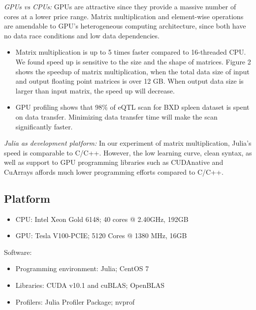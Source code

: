 \documentclass[9pt,twocolumn,twoside,lineno]{gsag3jnl}
\begin{document}
 {\em GPUs vs CPUs:} GPUs are attractive since they provide a
massive number of cores at a lower price range.
Matrix multiplication and element-wise operations are amendable
to GPU's heterogeneous computing architecture, since both have
no data race conditions and low data dependencies.


\begin{itemize}
	\item Matrix multiplication is up to 5 times faster
	compared to 16-threaded CPU.
	We found speed
	up is sensitive to the size and the shape of matrices.
	Figure 2 shows the speedup of matrix
	multiplication, when the total data size of input and output
	floating point matrices is over 12 GB.
	When output data size is
	larger than input matrix, the speed up will decrease. 
	\item  GPU profiling shows that 98\% of eQTL scan for BXD
	spleen dataset is spent on data transfer.
	Minimizing data transfer time will make the scan significantly
	faster.
\end{itemize}

      {\em Julia as development platform:} In our experiment
of matrix multiplication, Julia's speed is comparable to C/C++.
However, the low learning curve, clean syntax, as well as
support to GPU programming libraries such as CUDAnative and
CuArrays affords much lower programming efforts compared to
C/C++.

\fi


\subsection{Platform}
 \begin{itemize}
	\item CPU: Intel Xeon Gold 6148; 40 cores @ 2.40GHz, 192GB 
	\item GPU: Tesla V100-PCIE; 5120 Cores @ 1380 MHz, 16GB
\end{itemize}
Software: 
\begin{itemize}
	\item Programming environment: Julia; CentOS 7
	\item Libraries: CUDA v10.1 and cuBLAS; OpenBLAS
	\item Profilers: Julia Profiler Package; nvprof
\end{itemize}
\end{document}

